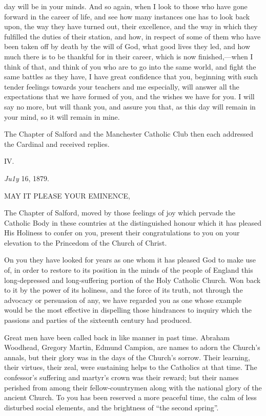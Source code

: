 day will be in your minds. And so again, when I look to those who have
gone forward in the career of life, and see how many instances one has
to look back upon, the way they have turned out, their excellence, and
the way in which they fulfilled the duties of their station, and how,
in respect of some of them who have been taken off by death by the
will of God, what good lives they led, and how much there is to be
thankful for in their career, which is now finished,—when I think of
that, and think of you who are to go into the same world, and fight
the same battles as they have, I have great confidence that you,
beginning with such tender feelings towards your teachers and me
especially, will answer all the expectations that we have formed
of you, and the wishes we have for you. I will say no more, but will
thank you, and assure you that, as this day will remain in your mind,
so it will remain in mine.

The Chapter of Salford and the Manchester Catholic Club then each
addressed the Cardinal and received replies.

IV.


\emph{Ju1y} 16, 1879.

MAY IT PLEASE
YOUR EMINENCE,

The Chapter of Salford, moved by those feelings of joy which pervade
the Catholic Body in these countries at the distinguished honour which
it has pleased His Holiness to confer on you, present their
congratulations to you on your elevation to the Princedom of the
Church of Christ.

On you they have looked for years as one whom it has pleased God to
make use of, in order to restore to its position in the minds of the
people of England this long-depressed and long-suffering portion of
the Holy Catholic Church. Won back to it by the power of its holiness,
and the force of its truth, not through the advocacy or persuasion of
any, we have regarded you as one whose example would be the most
effective in dispelling those hindrances to inquiry which the
passions and parties of the sixteenth century had produced.

Great men have been called back in like manner in past time.
Abraham Woodhead, Gregory Martin, Edmund Campion, are names to adorn
the Church's annals, but their glory was in the days of the Church's
sorrow. Their learning, their virtues, their zeal, were sustaining
helps to the Catholics at that time. The confessor's suffering and
martyr's crown was their reward; but their names perished from among
their fellow-countrymen along with the national glory of the ancient
Church. To you has been reserved a more peaceful time, the calm of
less disturbed social elements, and the brightness of ``the second
spring''.

